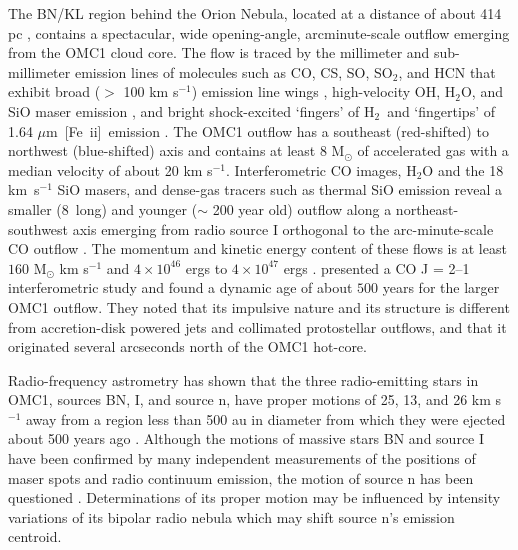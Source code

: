 \documentclass{aa}
\newcommand{\Feii}{[Fe~{\sc ii}]}
\newcommand{\um}{$\mu$m}
\newcommand{\hh}{\ensuremath{\textrm{H}_{2}}}			%
\begin{document}
The BN/KL region behind the Orion Nebula, located at a distance of about
414 pc \citep{Menten2007},  contains a spectacular,  wide opening-angle, 
arcminute-scale outflow emerging from the OMC1 cloud core.  The flow is 
traced by the millimeter and sub-millimeter emission lines of molecules 
such as CO, CS, SO, SO$_2$, and HCN  that exhibit  broad  
($>$ 100 km s$^{-1}$)  emission line wings 
\citep{KwanScoville1976, WisemanHo1996, FuruyaShinnaga2009},  
high-velocity OH, H$_2$O,  and SiO maser  emission \citep{Genzel1981,Greenhill1998}, 
and bright shock-excited `fingers' of  \hh\   and `fingertips' of 1.64 \um\  \Feii\   
emission \citep{AllenBurton93, Colgan2007, Nissen2007, 
LeeBurton2000, Bally2011}.    The OMC1 outflow has a southeast 
(red-shifted) to  northwest (blue-shifted) axis and contains  at least 8 M$_{\odot}$ of  
accelerated gas with a median velocity of about  20 km s$^{-1}$.     Interferometric 
CO images, H$_2$O and the 18 km~s$^{-1}$  SiO masers,   and dense-gas  
tracers such as  thermal SiO emission reveal a  smaller (8\arcsec\  long) 
and younger  ($\sim$ 200  year old) outflow along a  northeast-southwest axis 
emerging  from radio source I   orthogonal to the arc-minute-scale  CO outflow  
\citep{BeutherNissen2008,Plambeck2009}.    
The  momentum and kinetic   energy content of these flows is at least  
$160$ M$_{\odot}$ km s$^{-1}$ and  $4 \times 10^{46}$  ergs  \citep{Snell1984} to  
$4 \times 10^{47}$ ergs  \citep{KwanScoville1976}.     \citet{Zapata2009}  presented 
a CO J = 2--1 interferometric study and found a dynamic age of  about $500$ 
years for the larger OMC1 outflow.   They noted that its impulsive nature and 
its  structure is  different from accretion-disk  powered  jets and collimated 
protostellar outflows,  and that it  originated several arcseconds 
north of the  OMC1 hot-core.       

Radio-frequency astrometry has shown that
the three  radio-emitting stars in OMC1, sources BN, I, and 
source n, have  proper motions  of 25, 13, and 26 km s$^{-1}$ 
away from a region less than 500 au in diameter from which they were ejected 
about  500 years ago \citep{Rodriguez2005,Gomez2005,Gomez2008}.    Although
the motions of massive stars BN and source I have been confirmed by many 
independent measurements of the positions of maser spots and radio continuum 
emission,  the motion of source n has been questioned \citep{Goddi2011}.  
Determinations of its  proper  motion may be influenced by intensity 
variations of its bipolar radio nebula which may shift source n's  emission centroid. 
  
\end{document}
